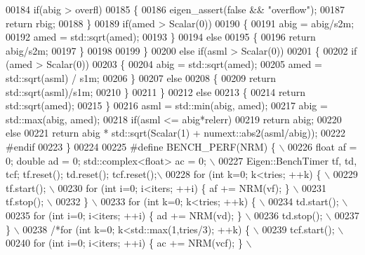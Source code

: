 \begin{DoxyCode}
00184     \textcolor{keywordflow}{if}(abig > overfl)
00185     \{
00186       eigen\_assert(\textcolor{keyword}{false} && \textcolor{stringliteral}{"overflow"});
00187       \textcolor{keywordflow}{return} rbig;
00188     \}
00189     \textcolor{keywordflow}{if}(amed > Scalar(0))
00190     \{
00191       abig = abig/s2m;
00192       amed = std::sqrt(amed);
00193     \}
00194     \textcolor{keywordflow}{else}
00195     \{
00196       \textcolor{keywordflow}{return} abig/s2m;
00197     \}
00198 
00199   \}
00200   \textcolor{keywordflow}{else} \textcolor{keywordflow}{if}(asml > Scalar(0))
00201   \{
00202     \textcolor{keywordflow}{if} (amed > Scalar(0))
00203     \{
00204       abig = std::sqrt(amed);
00205       amed = std::sqrt(asml) / s1m;
00206     \}
00207     \textcolor{keywordflow}{else}
00208     \{
00209       \textcolor{keywordflow}{return} std::sqrt(asml)/s1m;
00210     \}
00211   \}
00212   \textcolor{keywordflow}{else}
00213   \{
00214     \textcolor{keywordflow}{return} std::sqrt(amed);
00215   \}
00216   asml = std::min(abig, amed);
00217   abig = std::max(abig, amed);
00218   \textcolor{keywordflow}{if}(asml <= abig*relerr)
00219     \textcolor{keywordflow}{return} abig;
00220   \textcolor{keywordflow}{else}
00221     \textcolor{keywordflow}{return} abig * std::sqrt(Scalar(1) + numext::abs2(asml/abig));
00222 \textcolor{preprocessor}{  #endif}
00223 \}
00224 
00225 \textcolor{preprocessor}{#define BENCH\_PERF(NRM) \{ \(\backslash\)}
00226 \textcolor{preprocessor}{  float af = 0; double ad = 0; std::complex<float> ac = 0; \(\backslash\)}
00227 \textcolor{preprocessor}{  Eigen::BenchTimer tf, td, tcf; tf.reset(); td.reset(); tcf.reset();\(\backslash\)}
00228 \textcolor{preprocessor}{  for (int k=0; k<tries; ++k) \{ \(\backslash\)}
00229 \textcolor{preprocessor}{    tf.start(); \(\backslash\)}
00230 \textcolor{preprocessor}{    for (int i=0; i<iters; ++i) \{ af += NRM(vf); \} \(\backslash\)}
00231 \textcolor{preprocessor}{    tf.stop(); \(\backslash\)}
00232 \textcolor{preprocessor}{  \} \(\backslash\)}
00233 \textcolor{preprocessor}{  for (int k=0; k<tries; ++k) \{ \(\backslash\)}
00234 \textcolor{preprocessor}{    td.start(); \(\backslash\)}
00235 \textcolor{preprocessor}{    for (int i=0; i<iters; ++i) \{ ad += NRM(vd); \} \(\backslash\)}
00236 \textcolor{preprocessor}{    td.stop(); \(\backslash\)}
00237 \textcolor{preprocessor}{  \} \(\backslash\)}
00238 \textcolor{preprocessor}{  }\textcolor{comment}{/*for (int k=0; k<std::max(1,tries/3); ++k) \{ \(\backslash\)}
00239 \textcolor{comment}{    tcf.start(); \(\backslash\)}
00240 \textcolor{comment}{    for (int i=0; i<iters; ++i) \{ ac += NRM(vcf); \} \(\backslash\)}

\end{DoxyCode}
